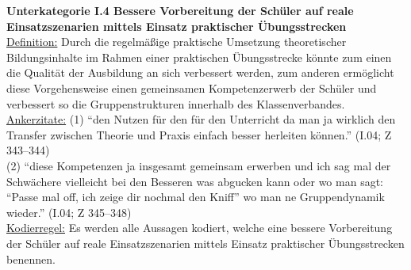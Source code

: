 \textbf{Unterkategorie I.4 Bessere Vorbereitung der Schüler auf reale Einsatzszenarien mittels Einsatz praktischer Übungsstrecken}\\
\underline{Definition:} Durch die regelmäßige praktische Umsetzung theoretischer Bildungsinhalte im Rahmen einer praktischen Übungsstrecke könnte zum einen die Qualität der Ausbildung an sich verbessert werden, zum anderen ermöglicht diese Vorgehensweise einen gemeinsamen Kompetenzerwerb der Schüler und verbessert so die Gruppenstrukturen innerhalb des Klassenverbandes.\\
\underline{Ankerzitate:} (1) "`den Nutzen für den für den Unterricht da man ja wirklich den Transfer zwischen Theorie und Praxis einfach besser herleiten können."' (I.04; Z 343--344)\\ (2) "`diese Kompetenzen ja insgesamt gemeinsam erwerben und ich sag mal der Schwächere vielleicht bei den Besseren was abgucken kann oder wo man sagt: "`Passe mal off, ich zeige dir nochmal den Kniff"' wo man ne Gruppendynamik wieder."' (I.04; Z 345--348)\\
\underline{Kodierregel:} Es werden alle Aussagen kodiert, welche eine bessere Vorbereitung der Schüler auf reale Einsatzszenarien mittels Einsatz praktischer Übungsstrecken benennen.
